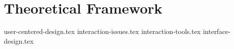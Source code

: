 \section{Theoretical Framework}
{user-centered-design.tex}
{interaction-issues.tex}
{interaction-tools.tex}
{interface-design.tex}
